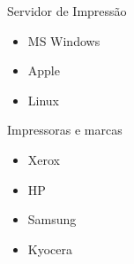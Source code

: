 \documentclass{if-beamer}
\begin{document}
\begin{frame}{Servidor de Impressão}
    \begin{itemize}
        \item MS Windows
        \item Apple
        \item Linux
    \end{itemize}
\end{frame}

\begin{frame}{Impressoras e marcas}
    \begin{itemize}
        \item Xerox
        \item HP
        \item Samsung
        \item Kyocera
    \end{itemize}
\end{frame}
\end{document}
